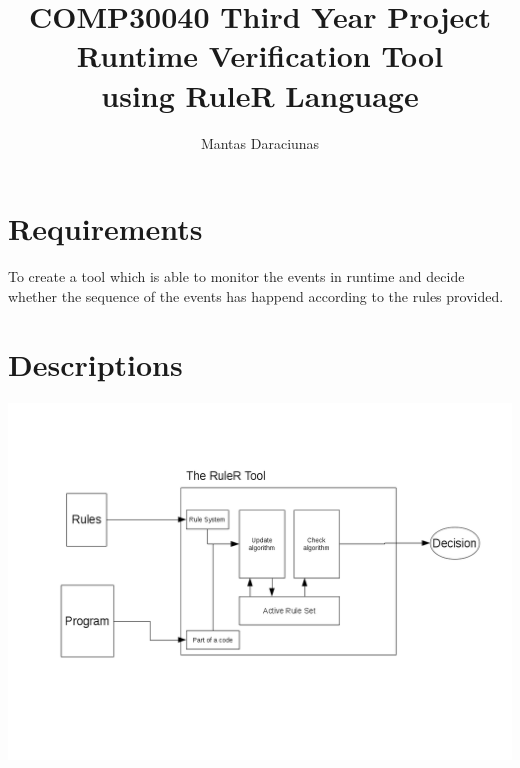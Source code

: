 \documentclass[a4paper]{article}
\begin{document}
\title{
\large COMP30040 Third Year Project
\\[0.7cm]
\textbf{\huge Runtime Verification Tool\\ using RuleR Language} 
}

\author{\Large Mantas Daraciunas} 
\date{}

\maketitle
\thispagestyle{firststyle} %
\newpage %

\tableofcontents
\pagestyle{rest}
\newpage
\section{Requirements}

To create a tool which is able to monitor the events in runtime and decide whether the sequence of the events has happend according to the rules provided. 

\newpage
\section{Descriptions}
\includegraphics[width=\textwidth,height=\textheight,keepaspectratio]{../Graphs/overallProcess.png}
\end{document}
